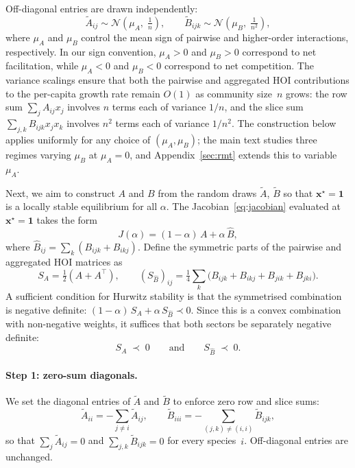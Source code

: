 \documentclass[pdflatex,sn-mathphys-num]{sn-jnl}%
\newcommand{\bone}{\mathbf{1}}
\newcommand{\bx}{\mathbf{x}}
\begin{document}
Off-diagonal entries are drawn independently:
\begin{equation}\label{eq:raw}
\tilde{A}_{ij} \sim \mathcal{N}(\mu_A, \; \tfrac{1}{n}), \qquad
\tilde{B}_{ijk} \sim \mathcal{N}(\mu_B, \; \tfrac{1}{n^2}),
\end{equation}
where $\mu_A$ and $\mu_B$ control the mean sign of pairwise and higher-order interactions, respectively. In our sign convention, $\mu_A > 0$ and $\mu_B > 0$ correspond to net facilitation, while $\mu_A < 0$ and $\mu_B < 0$ correspond to net competition. The variance scalings ensure that both the pairwise and aggregated HOI contributions to the per-capita growth rate remain $O(1)$ as community size~$n$ grows: the row sum $\sum_j A_{ij} x_j$ involves $n$ terms each of variance $1/n$, and the slice sum $\sum_{j,k} B_{ijk} x_j x_k$ involves $n^2$ terms each of variance $1/n^2$. The construction below applies uniformly for any choice of $(\mu_A, \mu_B)$; the main text studies three regimes varying $\mu_B$ at $\mu_A = 0$, and Appendix~\ref{sec:rmt} extends this to variable $\mu_A$.

Next, we aim to construct $A$ and $B$ from the random draws $\tilde{A}$, $\tilde{B}$ so that $\bx^\star = \bone$ is a locally stable equilibrium for all $\alpha$. The Jacobian~\eqref{eq:jacobian} evaluated at $\bx^\star = \bone$ takes the form
\begin{equation}\label{eq:jac}
J(\alpha) = (1-\alpha)\,A + \alpha\,\hat{B},
\end{equation}
where $\hat{B}_{ij} = \sum_k (B_{ijk} + B_{ikj})$. Define the symmetric parts of the pairwise and aggregated HOI matrices as
\begin{equation}\label{eq:sym_defs}
S_A = \tfrac{1}{2}(A + A^\top), \qquad 
(S_{\hat{B}})_{ij} = \tfrac{1}{4}\sum_k \bigl(B_{ijk} + B_{ikj} + B_{jik} + B_{jki}\bigr).
\end{equation}
A sufficient condition for Hurwitz stability is that the symmetrised combination is negative definite: $(1-\alpha)\,S_A + \alpha\,S_{\hat{B}} \prec 0$. Since this is a convex combination with non-negative weights, it suffices that both sectors be separately negative definite:
\begin{equation}\label{eq:stab_suff}
S_A \;\prec\; 0
\qquad\text{and}\qquad
S_{\hat{B}} \;\prec\; 0.
\end{equation}

\paragraph{Step 1: zero-sum diagonals.} We set the diagonal entries of $\tilde{A}$ and $\tilde{B}$ to enforce zero row and slice sums:
\begin{equation}\label{eq:zerosum}
\tilde{A}_{ii} = -\sum_{j \neq i} \tilde{A}_{ij}, \qquad
\tilde{B}_{iii} = -\sum_{(j,k)\neq (i,i)} \tilde{B}_{ijk},
\end{equation}
so that $\sum_j \tilde{A}_{ij} = 0$ and $\sum_{j,k} \tilde{B}_{ijk} = 0$ for every species~$i$. Off-diagonal entries are unchanged.
\end{document}

